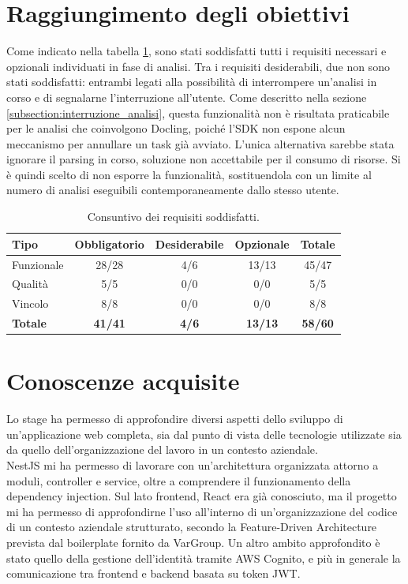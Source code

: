 \section{Raggiungimento degli obiettivi}
Come indicato nella tabella \ref{tab:requisiti_soddisfatti}, sono stati soddisfatti tutti i requisiti necessari e opzionali individuati in fase di analisi. Tra i requisiti desiderabili, due non sono stati soddisfatti: entrambi legati alla possibilità di interrompere un'analisi in corso e di segnalarne l'interruzione all'utente. Come descritto nella sezione \ref{subsection:interruzione_analisi}, questa funzionalità non è risultata praticabile per le analisi che coinvolgono Docling, poiché l'SDK non espone alcun meccanismo per annullare un task già avviato. L'unica alternativa sarebbe stata ignorare il parsing in corso, soluzione non accettabile per il consumo di risorse. Si è quindi scelto di non esporre la funzionalità, sostituendola con un limite al numero di analisi eseguibili contemporaneamente dallo stesso utente.

\begin{table}[h]
\centering
\begin{tabular}{|l|c|c|c|c|}
\hline
\textbf{Tipo} & \textbf{Obbligatorio} & \textbf{Desiderabile} & \textbf{Opzionale} & \textbf{Totale} \\
\hline
Funzionale & 28/28 & 4/6 & 13/13 & 45/47 \\
\hline
Qualità & 5/5 & 0/0 & 0/0 & 5/5 \\
\hline
Vincolo & 8/8 & 0/0 & 0/0 & 8/8 \\
\hline
\textbf{Totale} & \textbf{41/41} & \textbf{4/6} & \textbf{13/13} & \textbf{58/60} \\
\hline
\end{tabular}
\caption{Consuntivo dei requisiti soddisfatti.}
\label{tab:requisiti_soddisfatti}
\end{table}

\section{Conoscenze acquisite}
Lo stage ha permesso di approfondire diversi aspetti dello sviluppo di un'applicazione web completa, sia dal punto di vista delle tecnologie utilizzate sia da quello dell'organizzazione del lavoro in un contesto aziendale. \\

NestJS mi ha permesso di lavorare con un'architettura organizzata attorno a moduli, controller e service, oltre a comprendere il funzionamento della dependency injection. Sul lato frontend, React era già conosciuto, ma il progetto mi ha permesso di approfondirne l'uso all'interno di un'organizzazione del codice di un contesto aziendale strutturato, secondo la Feature-Driven Architecture prevista dal boilerplate fornito da VarGroup. Un altro ambito approfondito è stato quello della gestione dell'identità tramite AWS Cognito, e più in generale la comunicazione tra frontend e backend basata su token JWT. \\

